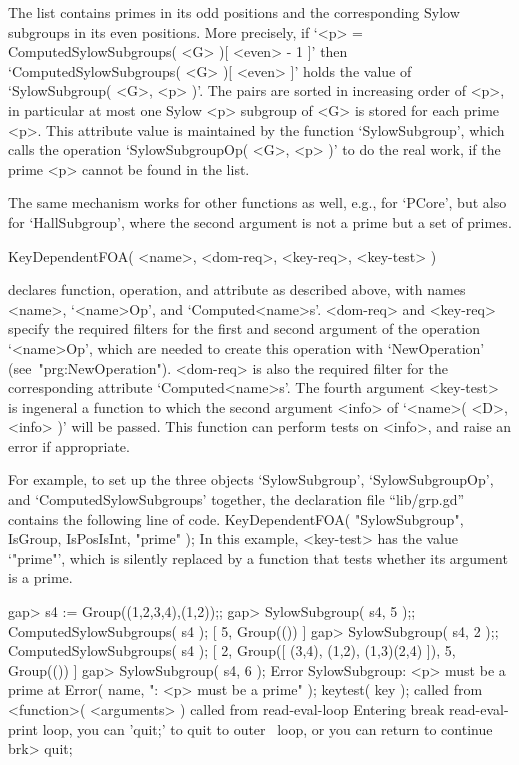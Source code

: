 The list contains primes in its odd positions and the corresponding Sylow
subgroups in its even positions.
More precisely, if `<p> = ComputedSylowSubgroups( <G> )[ <even> - 1 ]'
then `ComputedSylowSubgroups( <G> )[ <even> ]' holds the value
of `SylowSubgroup( <G>, <p> )'.
The pairs are sorted in increasing order of <p>,
in particular at most one Sylow <p> subgroup of <G> is stored for each
prime <p>.
This attribute value is maintained by the function `SylowSubgroup',
which calls the operation `SylowSubgroupOp( <G>, <p> )' to do the real
work, if the prime <p> cannot be found in the list.

The same mechanism works for other functions as well, e.g., for `PCore',
but also for `HallSubgroup',
where the second argument is not a prime but a set of primes.

\>KeyDependentFOA( <name>, <dom-req>, <key-req>, <key-test> )

declares function, operation, and attribute as described above,
with names <name>, `<name>Op', and `Computed<name>s'.
<dom-req> and <key-req> specify the required filters for the first and
second argument of the operation `<name>Op',
which are needed to create this operation with `NewOperation'
(see~"prg:NewOperation").
<dom-req> is also the required filter for the corresponding attribute
`Computed<name>s'.
The fourth argument <key-test> is ingeneral a function to which the second
argument <info> of `<name>(  <D>, <info> )' will be passed.
This function can perform tests on <info>,
and raise an error if appropriate.

For example, to set up the three objects `SylowSubgroup', `SylowSubgroupOp',
and `ComputedSylowSubgroups' together,
the declaration file ``lib/grp.gd'' contains the following line of code.
\begintt
KeyDependentFOA( "SylowSubgroup", IsGroup, IsPosIsInt, "prime" );
\endtt
In this example, <key-test> has the value `"prime"',
which is silently replaced by a function that tests whether its argument
is a prime.

\beginexample
gap> s4 := Group((1,2,3,4),(1,2));;
gap> SylowSubgroup( s4, 5 );;  ComputedSylowSubgroups( s4 );
[ 5, Group(()) ]
gap> SylowSubgroup( s4, 2 );;  ComputedSylowSubgroups( s4 );
[ 2, Group([ (3,4), (1,2), (1,3)(2,4) ]), 5, Group(()) ]
\endexample
\beginexample
gap> SylowSubgroup( s4, 6 );                                
Error SylowSubgroup: <p> must be a prime at
Error( name, ": <p> must be a prime" );
keytest( key ); called from
<function>( <arguments> ) called from read-eval-loop
Entering break read-eval-print loop, you can 'quit;' to quit to outer \
loop,
or you can return to continue
brk> quit;
\endexample

